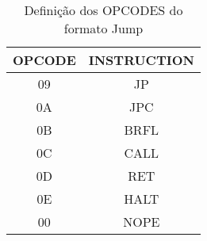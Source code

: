 \begin{table}[H]
\centering 	
  	\begin{tabular}{|c|c|}
  	\hline 
  	OPCODE & INSTRUCTION \\ 
  	\hline 
  	09 & JP \\ 
  	\hline 
  	0A & JPC \\ 
  	\hline 
  	0B & BRFL \\ 
  	\hline 
  	0C & CALL \\ 
  	\hline 
  	0D & RET \\ 
  	\hline 
  	0E & HALT \\ 
  	\hline 
  	00 & NOPE \\ 
  	\hline 
  	\end{tabular} 
  	  	\caption{Definição dos OPCODES do formato Jump}
\end{table}
 